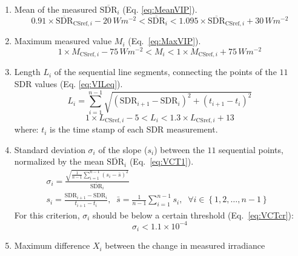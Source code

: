 \documentclass[applsci,article,submit,moreauthors,pdftex]{Definitions/mdpi}
\providecommand{\tightlist}{%
  \setlength{\itemsep}{0pt}\setlength{\parskip}{0pt}}
\begin{document}
\begin{enumerate}
\def\labelenumi{\alph{enumi})}
\tightlist
\item
  Mean of the measured \(\overline{\text{SDR}}_i\) (Eq.
  \ref{eq:MeanVIP}). \begin{equation}
  0.91 \times \overline{\text{SDR}}_{\text{CSref},i} - 20\,Wm^{-2}
  < \overline{\text{SDR}}_i <
  1.095 \times \overline{\text{SDR}}_{\text{CSref},i} + 30\,Wm^{-2}
  \label{eq:MeanVIP}
  \end{equation}
\item
  Maximum measured value \(M_{i}\) (Eq.~\ref{eq:MaxVIP}).
  \begin{equation}
  1 \times M_{\text{CSref},i} - 75\,Wm^{-2}
  < M_{i} <
  1 \times M_{\text{CSref},i} + 75\,Wm^{-2}
  \label{eq:MaxVIP}
  \end{equation}
\item
  Length \(L_i\) of the sequential line segments, connecting the points
  of the \(11\) SDR values (Eq. \ref{eq:VILeq}). \begin{equation}
  L_i = \sum_{i=1}^{n-1}\sqrt{\left ( \text{SDR}_{i+1} - \text{SDR}_{i}\right )^2 + \left ( t_{i+1} - t_i \right )^2}
  \label{eq:VILeq}
  \end{equation} \begin{equation}
  1 \times L_{\text{CSref},i} - 5 < L_i < 1.3 \times L_{\text{CSref},i} + 13
  \label{eq:VILcr}
  \end{equation} where: \(t_i\) is the time stamp of each SDR
  measurement.
\item
  Standard deviation \(\sigma_i\) of the slope (\(s_i\)) between the
  \(11\) sequential points, normalized by the mean
  \(\overline{\text{SDR}}_i\) (Eq.~\ref{eq:VCT1}). \begin{gather}
    \sigma_i = \frac{\sqrt{\frac{1}{n-1} \sum_{i=1}^{n-1} \left( s_i - \bar{s} \right)^2}}{\overline{\text{SDR}}_i} \label{eq:VCT1} \\
    s_i = \frac{\text{SDR}_{i+1} - \text{SDR}_{i}}{t_{i+1} - t_i},\;\;   \bar{s} = \frac{1}{n-1} \sum_{i=1}^{n-1} s_i,\;\;\forall i \in \left \{ 1, 2, \ldots, n-1 \right \}\;\;
  \end{gather} For this criterion, \(\sigma_i\) should be below a
  certain threshold (Eq.~\ref{eq:VCTcr}): \begin{equation}
    \sigma_i < \ensuremath{1.1\times 10^{-4}} \label{eq:VCTcr}
  \end{equation}
\item
  Maximum difference \(X_i\) between the change in measured irradiance

\end{enumerate}
\end{document}
